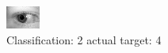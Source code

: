 \begin{figure}[h!]
\begin{center}
\includegraphics[width=0.60\columnwidth]{figures/ID805_class_2_target_4.png}
\end{center}
\caption{ Classification: 2 actual target: 4}
\label{fig:ID805_class_2_target_4}
\end{figure}
